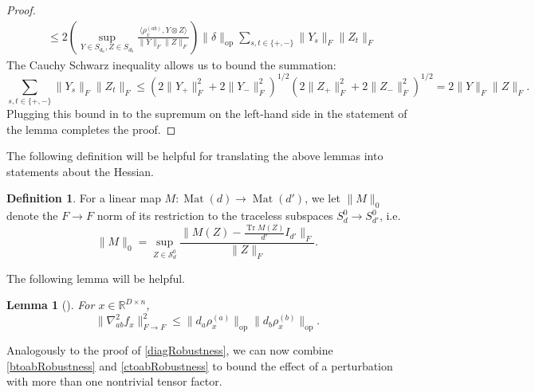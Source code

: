 \documentclass[aos]{imsart}
\newtheorem{lemma}[theorem]{Lemma}
\theoremstyle{definition}
\newtheorem*{definition}{Definition}
\numberwithin{equation}{section}
\DeclareMathOperator{\op}{op}
\DeclareMathOperator{\Mat}{Mat}
\DeclareMathOperator{\tr}{Tr}
\newcommand{\R}{{\mathbb{R}}}
\newcommand{\Sym}{\mathcal{S}}
\newcommand{\smallSym}{S}
\newcommand{\samp}{x}
\newcommand{\AR}[1]{{\color{orange}[AR: #1]}}
\newcommand{\AR}[1]{{}}
\begin{document}
\begin{appendix}
\begin{proof}
\begin{align*}
&\leq 2\left( \sup_{Y \in \smallSym_{d_{a}}, Z \in \smallSym_{d_{b}}} \frac{\langle \rho_{\samp}^{(ab)}, Y \otimes Z \rangle}{\|Y\|_{F} \|Z\|_{F}} \right) \|\delta\|_{\op} \sum_{s,t \in \{+,-\}} \|Y_{s}\|_{F} \|Z_{t}\|_{F}
\end{align*}
The Cauchy Schwarz inequality allows us to bound the summation:
\[\sum_{s,t \in \{+,-\}} \|Y_{s}\|_{F} \|Z_{t}\|_{F}  \leq (2\|Y_{+}\|_{F}^{2} + 2\|Y_{-}\|_{F}^{2})^{1/2} (2\|Z_{+}\|_{F}^{2} + 2\|Z_{-}\|_{F}^{2})^{1/2} = 2 \|Y\|_{F} \|Z\|_{F} .   \]
Plugging this bound in to the supremum on the left-hand side in the statement of the lemma completes the proof.
\end{proof}

The following definition will be helpful for translating the above lemmas into statements about the Hessian.
\begin{definition}
For a linear map $M : \Mat(d) \to \Mat(d')$, we let $\|M\|_{0}$ denote the $F \to F$ norm of its restriction to the traceless subspaces $\smallSym^0_{d} \to \smallSym^0_{d'}$, i.e.
$$ \|M\|_0 = \sup_{Z \in \Sym^0_{d}} \frac{\|M(Z) - \frac{\tr M(Z)}{d'} I_{d'}\|_F}{\|Z\|_F}.$$
\end{definition}
The following lemma will be helpful.

\begin{lemma}[\cite{KLR19}] \label{inftyto2} For $x \in \R^{D \times n}$,
$$\|\nabla^{2}_{ab} f_{\samp}\|_{F \to F}^{2} \leq \|d_{a} \rho_{\samp}^{(a)}\|_{\op} \|d_{b} \rho_{\samp}^{(b)}\|_{\op}.$$
\end{lemma}
Analogously to the proof of \cref{diagRobustness}, we can now combine \cref{btoabRobustness} and \cref{ctoabRobustness} to bound the effect of a perturbation with more than one nontrivial tensor factor.


\end{appendix}
\end{document}
